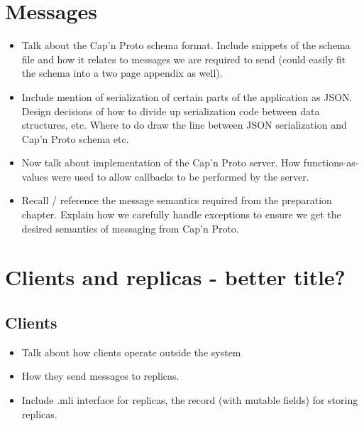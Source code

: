 \section{Messages}

\begin{itemize}
  \item Talk about the Cap'n Proto schema format. Include snippets of the schema file and how it relates to messages we are required to send (could easily fit the schema into a two page appendix as well).
  \item Include mention of serialization of certain parts of the application as JSON. Design decisions of how to divide up serialization code between data structures, etc. Where to do draw the line between JSON serialization and Cap'n Proto schema etc.
  \item Now talk about implementation of the Cap'n Proto server. How functions-as-values were used to allow callbacks to be performed by the server.
  \item Recall / reference the message semantics required from the preparation chapter. Explain how we carefully handle exceptions to ensure we get the desired semantics of messaging from Cap'n Proto.
 \end{itemize}

\section{Clients and replicas - better title?}

\subsection{Clients}
\begin{itemize}
  \item Talk about how clients operate outside the system
  \item How they send messages to replicas.
  \item Include .mli interface for replicas, the record (with mutable fields) for storing replicas.
\end{itemize}

